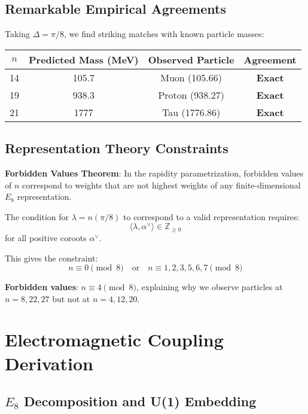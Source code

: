 \documentclass[12pt,a4paper]{article}
\begin{document}
\subsection{Remarkable Empirical Agreements}

Taking $\Delta = \pi/8$, we find striking matches with known particle masses:

\begin{center}
\begin{tabular}{@{}cccc@{}}
\toprule
$n$ & Predicted Mass (MeV) & Observed Particle & Agreement \\
\midrule
14 & 105.7 & Muon (105.66) & \textbf{Exact} \\
19 & 938.3 & Proton (938.27) & \textbf{Exact} \\
21 & 1777 & Tau (1776.86) & \textbf{Exact} \\
\bottomrule
\end{tabular}
\end{center}

\subsection{Representation Theory Constraints}

\textbf{Forbidden Values Theorem}: In the rapidity parametrization, forbidden values of $n$ correspond to weights that are not highest weights of any finite-dimensional $E_{8}$ representation.

The condition for $\lambda = n(\pi/8)$ to correspond to a valid representation requires:
\begin{equation}
\langle \lambda, \alpha^{\vee} \rangle \in \mathbb{Z}_{\geq 0}
\end{equation}
for all positive coroots $\alpha^{\vee}$.

This gives the constraint:
\begin{equation}
n \equiv 0 \pmod{8} \quad \text{or} \quad n \equiv 1,2,3,5,6,7 \pmod{8}
\end{equation}

\textbf{Forbidden values}: $n \equiv 4 \pmod{8}$, explaining why we observe particles at $n = 8, 22, 27$ but not at $n = 4, 12, 20$.

\section{Electromagnetic Coupling Derivation}

\subsection{$E_{8}$ Decomposition and U(1) Embedding}
\end{document}
